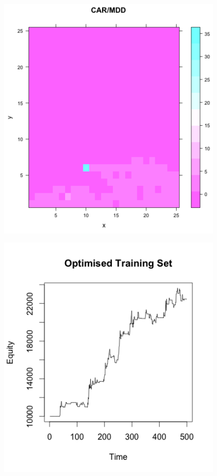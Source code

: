 \documentclass[12pt]{article}
\theoremstyle{definition}
\begin{document}
\begin{figure}[ht]
\centering
\begin{minipage}{0.45\textwidth}
  \centering
  \includegraphics[width=1\textwidth]{opt_curve}
  \label{fig:test8}
\end{minipage}
\begin{minipage}{0.45\textwidth}
  \centering
  \includegraphics[width=1\textwidth]{opt_eq}
  \label{fig:test9}
\end{minipage}
\end{figure}\\
\end{document}
